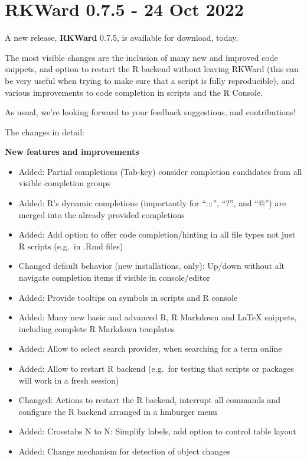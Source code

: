 \documentclass[
  letterpaper,
  DIV=11,
  numbers=noendperiod]{scrreprt}
\providecommand{\tightlist}{%
  \setlength{\itemsep}{0pt}\setlength{\parskip}{0pt}}\usepackage{longtable,booktabs,array}
\begin{document}
\hypertarget{rkward-0.7.5---24-oct-2022}{%
\section{\texorpdfstring{\textbf{RKWard} 0.7.5 - 24 Oct
2022}{RKWard 0.7.5 - 24 Oct 2022}}\label{rkward-0.7.5---24-oct-2022}}

A new release, \textbf{RKWard} 0.7.5, is available for download, today.

The most visible changes are the inclusion of many new and improved code
snippets, and option to restart the R backend without leaving RKWard
(this can be very useful when trying to make sure that a script is fully
reproducible), and various improvements to code completion in scripts
and the R Console.

As usual, we're looking forward to your feedback suggestions, and
contributions!

The changes in detail:

\textbf{New features and improvements}

\begin{itemize}
\tightlist
\item
  Added: Partial completions (Tab-key) consider completion candidates
  from all visible completion groups
\item
  Added: R's dynamic completions (importantly for ``:::'', ``?'', and
  ``@'') are merged into the already provided completions
\item
  Added: Add option to offer code completion/hinting in all file types
  not just R scripts (e.g.~in .Rmd files)
\item
  Changed default behavior (new installations, only): Up/down without
  alt navigate completion items if visible in console/editor
\item
  Added: Provide tooltips on symbols in scripts and R console
\item
  Added: Many new basic and advanced R, R Markdown and LaTeX snippets,
  including complete R Markdown templates
\item
  Added: Allow to select search provider, when searching for a term
  online
\item
  Added: Allow to restart R backend (e.g.~for testing that scripts or
  packages will work in a fresh session)
\item
  Changed: Actions to restart the R backend, interrupt all commands and
  configure the R backend arranged in a hmburger menu
\item
  Added: Crosstabs N to N: Simplify labels, add option to control table
  layout
\item
  Added: Change mechanism for detection of object changes
\end{itemize}
\end{document}
